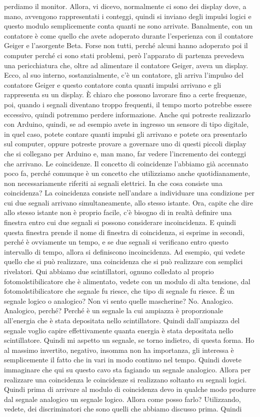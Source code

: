 perdiamo il monitor. Allora, vi dicevo, normalmente ci sono dei display dove, a mano, avvengono rappresentati i conteggi, quindi si inviano degli impulsi logici e questo modulo semplicemente conta quanti ne sono arrivate. Banalmente, con un contatore è come quello che avete adoperato durante l'esperienza con il contatore Geiger e l'asorgente Beta. Forse non tutti, perché alcuni hanno adoperato poi il computer perché ci sono stati problemi, però l'apparato di partenza prevedeva una pericchiatura che, oltre ad alimentare il contatore Geiger, aveva un display. Ecco, al suo interno, sostanzialmente, c'è un contatore, gli arriva l'impulso del contatore Geiger e questo contatore conta quanti impulsi arrivano e gli rappresenta su un display. È chiaro che possono lavorare fino a certe frequenze, poi, quando i segnali diventano troppo frequenti, il tempo morto potrebbe essere eccessivo, quindi potremmo perdere informazione. Anche qui potreste realizzarlo con Arduino, quindi, se ad esempio avete in ingresso un sensore di tipo digitale, in quel caso, potete contare quanti impulsi gli arrivano e potete ora presentarlo sul computer, oppure potreste provare a governare uno di questi piccoli display che si collegano per Arduino e, man mano, far vedere l'incremento dei conteggi che arrivano. Le coincidenze. Il concetto di coincidenze l'abbiamo già accennato poco fa, perché comunque è un concetto che utilizziamo anche quotidianamente, non necessariamente riferiti ai segnali elettrici. In che cosa consiste una coincidenza? La coincidenza consiste nell'andare a individuare una condizione per cui due segnali arrivano simultaneamente, allo stesso istante. Ora, capite che dire allo stesso istante non è proprio facile, c'è bisogno di in realtà definire una finestra entro cui due segnali si possono considerare incoincidenza. E quindi questa finestra prende il nome di finestra di coincidenza, si esprime in secondi, perché è ovviamente un tempo, e se due segnali si verificano entro questo intervallo di tempo, allora si definiscono incoincidenza. Ad esempio, qui vedete quello che si può realizzare, una coincidenza che si può realizzare con semplici rivelatori. Qui abbiamo due scintillatori, ognuno colledato al proprio fotomolstibilicatore che è alimentato, vedete con un modulo di alta tensione, dal fotomolstibilicatore che segnale fu riesce, che tipo di segnale fu riesce. È un segnale logico o analogico? Non vi sento quelle mascherine? No. Analogico. Analogico, perché? Perché è un segnale la cui ampiazza è proporzionale all'energia che è stata depositata nello scintillatore. Quindi dall'ampiazza del segnale voglio capire effettivamente quanta energia è stata depositata nello scintillatore. Quindi mi aspetto un segnale, se torno indietro, di questa forma. Ho al massimo invertito, negativo, insomma non ha importanza, gli interessa è semplicemente il fatto che in vari in modo continuo nel tempo. Quindi dovete immaginare che qui su questo cavo sta fagiando un segnale analogico. Allora per realizzare una coincidenza le coincidenze si realizzano soltanto su segnali logici. Quindi prima di arrivare al modulo di coincidenza devo in qualche modo produrre dal segnale analogico un segnale logico. Allora come posso farlo? Utilizzando, vedete, dei discriminatori che sono quelli che abbiamo discusso prima. Quindi 